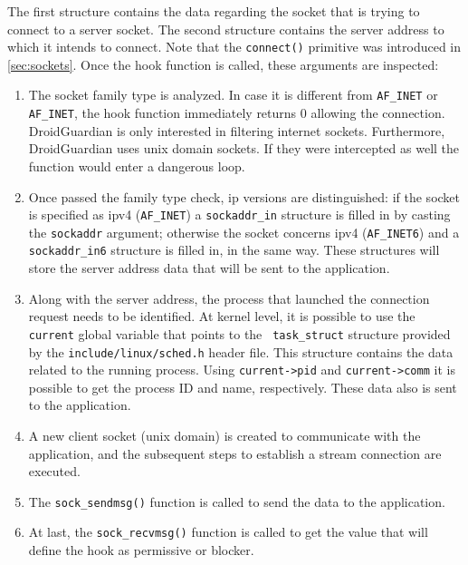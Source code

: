 The first structure contains the data regarding the socket that is trying to connect to a server socket. The second structure contains the server address to which it intends to connect. Note that the \texttt{connect()} primitive was introduced in \autoref{sec:sockets}. Once the hook function is called, these arguments are inspected:

\begin{enumerate}
\item The socket family type is analyzed. In case it is different from \texttt{AF\_INET} or \texttt{AF\_INET}, the hook function immediately returns 0 allowing the connection. DroidGuardian is only interested in filtering internet sockets. Furthermore, DroidGuardian uses unix domain sockets. If they were intercepted as well the function would enter a dangerous loop.

\item Once passed the family type check, \gls{ip} versions are distinguished: if the socket is specified as \gls{ip}v4 (\texttt{AF\_INET}) a \texttt{sockaddr\_in} structure is filled in by casting the \texttt{sockaddr} argument; otherwise the socket concerns \gls{ip}v4 (\texttt{AF\_INET6}) and a \texttt{sockaddr\_in6} structure is filled in, in the same way. These structures will store the server address data that will be sent to the application.

\item Along with the server address, the process that launched the connection request needs to be identified. At kernel level, it is possible to use the \texttt{current} global variable that points to the \texttt{ task\_struct} structure provided by the \texttt{include/linux/sched.h} header file. This structure contains the data related to the running process. Using \texttt{current->pid} and \texttt{current->comm} it is possible to get the process ID and name, respectively. These data also is sent to the application.

\item A new client socket (unix domain) is created to communicate with the application, and the subsequent steps to establish a stream connection are executed.

\item The \texttt{sock\_sendmsg()} function is called to send the data to the application.

\item At last, the \texttt{sock\_recvmsg()} function is called to get the value that will define the hook as permissive or blocker.
\end{enumerate}

